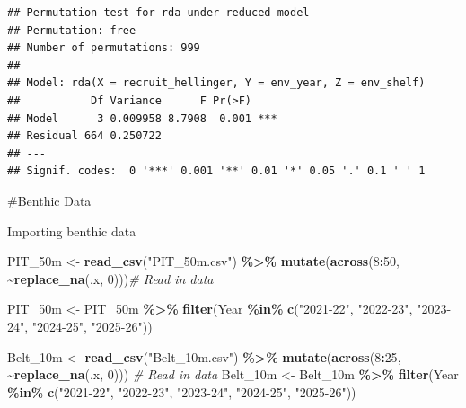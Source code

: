 \documentclass[
]{article}
\newenvironment{Shaded}{\begin{snugshade}}{\end{snugshade}}
\newcommand{\CommentTok}[1]{\textcolor[rgb]{0.56,0.35,0.01}{\textit{#1}}}
\newcommand{\DecValTok}[1]{\textcolor[rgb]{0.00,0.00,0.81}{#1}}
\newcommand{\FunctionTok}[1]{\textcolor[rgb]{0.13,0.29,0.53}{\textbf{#1}}}
\newcommand{\NormalTok}[1]{#1}
\newcommand{\OtherTok}[1]{\textcolor[rgb]{0.56,0.35,0.01}{#1}}
\newcommand{\SpecialCharTok}[1]{\textcolor[rgb]{0.81,0.36,0.00}{\textbf{#1}}}
\newcommand{\StringTok}[1]{\textcolor[rgb]{0.31,0.60,0.02}{#1}}
\begin{document}
\begin{verbatim}
## Permutation test for rda under reduced model
## Permutation: free
## Number of permutations: 999
## 
## Model: rda(X = recruit_hellinger, Y = env_year, Z = env_shelf)
##           Df Variance      F Pr(>F)    
## Model      3 0.009958 8.7908  0.001 ***
## Residual 664 0.250722                  
## ---
## Signif. codes:  0 '***' 0.001 '**' 0.01 '*' 0.05 '.' 0.1 ' ' 1
\end{verbatim}

\#Benthic Data

Importing benthic data

\begin{Shaded}
\begin{Highlighting}[]
\NormalTok{PIT\_50m }\OtherTok{\textless{}{-}} \FunctionTok{read\_csv}\NormalTok{(}\StringTok{"PIT\_50m.csv"}\NormalTok{) }\SpecialCharTok{\%\textgreater{}\%}
  \FunctionTok{mutate}\NormalTok{(}\FunctionTok{across}\NormalTok{(}\DecValTok{8}\SpecialCharTok{:}\DecValTok{50}\NormalTok{, }\SpecialCharTok{\textasciitilde{}}\FunctionTok{replace\_na}\NormalTok{(.x, }\DecValTok{0}\NormalTok{)))}\CommentTok{\# Read in data}

\NormalTok{PIT\_50m }\OtherTok{\textless{}{-}}\NormalTok{ PIT\_50m }\SpecialCharTok{\%\textgreater{}\%} 
  \FunctionTok{filter}\NormalTok{(Year }\SpecialCharTok{\%in\%} \FunctionTok{c}\NormalTok{(}\StringTok{"2021{-}22"}\NormalTok{, }\StringTok{"2022{-}23"}\NormalTok{, }\StringTok{"2023{-}24"}\NormalTok{, }\StringTok{"2024{-}25"}\NormalTok{, }\StringTok{"2025{-}26"}\NormalTok{))}

\NormalTok{Belt\_10m }\OtherTok{\textless{}{-}} \FunctionTok{read\_csv}\NormalTok{(}\StringTok{"Belt\_10m.csv"}\NormalTok{) }\SpecialCharTok{\%\textgreater{}\%}
  \FunctionTok{mutate}\NormalTok{(}\FunctionTok{across}\NormalTok{(}\DecValTok{8}\SpecialCharTok{:}\DecValTok{25}\NormalTok{, }\SpecialCharTok{\textasciitilde{}}\FunctionTok{replace\_na}\NormalTok{(.x, }\DecValTok{0}\NormalTok{))) }\CommentTok{\# Read in data}
\NormalTok{Belt\_10m }\OtherTok{\textless{}{-}}\NormalTok{ Belt\_10m }\SpecialCharTok{\%\textgreater{}\%}
  \FunctionTok{filter}\NormalTok{(Year }\SpecialCharTok{\%in\%} \FunctionTok{c}\NormalTok{(}\StringTok{"2021{-}22"}\NormalTok{, }\StringTok{"2022{-}23"}\NormalTok{, }\StringTok{"2023{-}24"}\NormalTok{, }\StringTok{"2024{-}25"}\NormalTok{, }\StringTok{"2025{-}26"}\NormalTok{))}
\end{Highlighting}
\end{Shaded}
\end{document}
